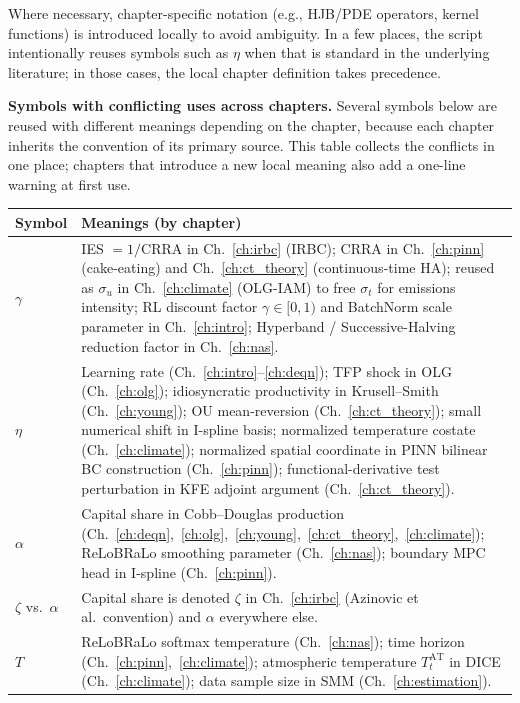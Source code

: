 \documentclass[11pt,a4paper]{report}
\begin{document}
Where necessary, chapter-specific notation (e.g., HJB/PDE operators, kernel functions) is introduced locally to avoid ambiguity.  In a few places, the script intentionally reuses symbols such as $\eta$ when that is standard in the underlying literature; in those cases, the local chapter definition takes precedence.

\medskip
\noindent\textbf{Symbols with conflicting uses across chapters.}  Several symbols below are reused with different meanings depending on the chapter, because each chapter inherits the convention of its primary source.  This table collects the conflicts in one place; chapters that introduce a new local meaning also add a one-line warning at first use.

\begin{center}
\footnotesize
\renewcommand{\arraystretch}{1.15}
\begin{tabular}{l L{10cm}}
\toprule
Symbol & Meanings (by chapter) \\
\midrule
$\gamma$ & IES $=1/\text{CRRA}$ in Ch.~\ref{ch:irbc} (IRBC); CRRA in Ch.~\ref{ch:pinn} (cake-eating) and Ch.~\ref{ch:ct_theory} (continuous-time HA); reused as $\sigma_u$ in Ch.~\ref{ch:climate} (OLG-IAM) to free $\sigma_t$ for emissions intensity; RL discount factor $\gamma\in[0,1)$ and BatchNorm scale parameter in Ch.~\ref{ch:intro}; Hyperband / Successive-Halving reduction factor in Ch.~\ref{ch:nas}. \\
$\eta$ & Learning rate (Ch.~\ref{ch:intro}--\ref{ch:deqn}); TFP shock in OLG (Ch.~\ref{ch:olg}); idiosyncratic productivity in Krusell--Smith (Ch.~\ref{ch:young}); OU mean-reversion (Ch.~\ref{ch:ct_theory}); small numerical shift in I-spline basis; normalized temperature costate (Ch.~\ref{ch:climate}); normalized spatial coordinate in PINN bilinear BC construction (Ch.~\ref{ch:pinn}); functional-derivative test perturbation in KFE adjoint argument (Ch.~\ref{ch:ct_theory}). \\
$\alpha$ & Capital share in Cobb--Douglas production (Ch.~\ref{ch:deqn},~\ref{ch:olg},~\ref{ch:young},~\ref{ch:ct_theory},~\ref{ch:climate}); ReLoBRaLo smoothing parameter (Ch.~\ref{ch:nas}); boundary MPC head in I-spline (Ch.~\ref{ch:pinn}). \\
$\zeta$ vs.\ $\alpha$ & Capital share is denoted $\zeta$ in Ch.~\ref{ch:irbc} (Azinovic et al.\ convention) and $\alpha$ everywhere else. \\
$T$ & ReLoBRaLo softmax temperature (Ch.~\ref{ch:nas}); time horizon (Ch.~\ref{ch:pinn},~\ref{ch:climate}); atmospheric temperature $T^{\mathrm{AT}}_t$ in DICE (Ch.~\ref{ch:climate}); data sample size in SMM (Ch.~\ref{ch:estimation}). \\

\end{tabular}
\end{center}
\end{document}
